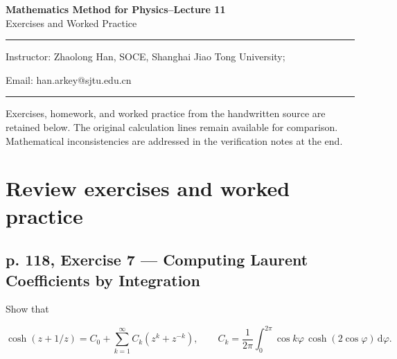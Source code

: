 \documentclass[11pt,a4paper]{article}
\theoremstyle{definition}
\theoremstyle{plain}
\begin{document}
\begin{center}
    {\LARGE \textbf{Mathematics Method for Physics--Lecture 11}} \\[0.6em]
    {\large Exercises and Worked Practice}
\end{center}

\vspace{-0.5em}
\noindent\rule{\textwidth}{0.5pt}
\vspace{0.3em}

\begin{center}
    Instructor: Zhaolong Han, SOCE, Shanghai Jiao Tong University;
\end{center}

\vspace{-0.6em}
\noindent Email: han.arkey@sjtu.edu.cn

\vspace{0.4em}
\noindent\rule{\textwidth}{0.5pt}

\vspace{0.8em}

\vspace{1.5em}


Exercises, homework, and worked practice from the handwritten source are retained below. The original calculation lines remain available for comparison. Mathematical inconsistencies are addressed in the verification notes at the end.

\section{Review exercises and worked practice}

\subsection{p. 118, Exercise 7 --- Computing Laurent Coefficients by Integration}

Show that

\[
\cosh(z+1/z)=C_0+\sum_{k=1}^{\infty}C_k(z^k+z^{-k}),
\qquad
C_k=\frac1{2\pi}\int_0^{2\pi}\cos k\varphi\,\cosh(2\cos\varphi)\,\mathrm{d}\varphi.
\]
\end{document}
